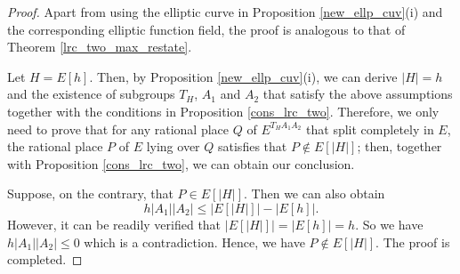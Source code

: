 \documentclass[10pt,a4paper]{amsart}
\begin{document}
\begin{proof}
    Apart from using the elliptic curve in Proposition \ref{new_ellp_cuv}(i) and the corresponding elliptic function field, the proof is analogous to that of Theorem \ref{lrc_two_max_restate}. 
    
    Let \(H = E[h]\). Then, by Proposition \ref{new_ellp_cuv}(i), we can derive \(|H| = h\) and the existence of subgroups \(T_H\), \(A_1\) and \(A_2\) that satisfy the above assumptions together with the conditions in Proposition \ref{cons_lrc_two}. Therefore, we only need to prove that for any rational place \(Q\) of \( E^{T_HA_1A_2} \) that split completely in \( E \), the rational place $P$ of $E$ lying over $Q$ satisfies that \(P\notin E[|H|]\); then, together with Proposition \ref{cons_lrc_two}, we can obtain our conclusion. 

    Suppose, on the contrary, that \(P\in E[|H|]\). Then we can also obtain 
    \[
        h|A_1||A_2|\le |E[|H|]|-|E[h]|.
    \]
    However, it can be readily verified that \(|E[|H|]|=|E[h]|=h\). So we have \(h|A_1||A_2|\le 0 \) which is a contradiction. Hence, we have \(P\notin E[|H|]\). The proof is completed. 
\end{proof}
\end{document}
